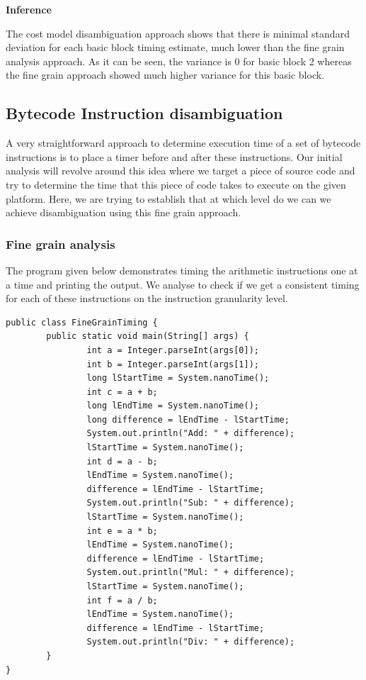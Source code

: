 \documentclass[11pt]{article}
\begin{document}
\textbf{Inference}

The cost model disambiguation approach shows that there is minimal standard deviation for each basic block timing estimate, much lower than the fine grain analysis approach. As it can be seen, the variance is 0 for basic block 2 whereas the fine grain approach showed much higher variance for this basic block.
\newpage

\subsection{Bytecode Instruction disambiguation}
A very straightforward approach to determine execution time of a set of bytecode instructions is to place a timer before and after these instructions. Our initial analysis will revolve around this idea where we target a piece of source code and try to determine the time that this piece of code takes to execute on the given platform. Here, we are trying to establish that at which level do we can we achieve disambiguation using this fine grain approach. 

\subsubsection{Fine grain analysis}

The program given below demonstrates timing the arithmetic instructions one at a time and printing the output. We analyse to check if we get a consistent timing for each of these instructions on the instruction granularity level.

\begin{lstlisting}
public class FineGrainTiming {
        public static void main(String[] args) {
                int a = Integer.parseInt(args[0]);
                int b = Integer.parseInt(args[1]);
                long lStartTime = System.nanoTime();
                int c = a + b;
                long lEndTime = System.nanoTime();
                long difference = lEndTime - lStartTime;
                System.out.println("Add: " + difference);
                lStartTime = System.nanoTime();
                int d = a - b;
                lEndTime = System.nanoTime();
                difference = lEndTime - lStartTime;
                System.out.println("Sub: " + difference);
                lStartTime = System.nanoTime();
                int e = a * b;
                lEndTime = System.nanoTime();
                difference = lEndTime - lStartTime;
                System.out.println("Mul: " + difference);
                lStartTime = System.nanoTime();
                int f = a / b;
                lEndTime = System.nanoTime();
                difference = lEndTime - lStartTime;
                System.out.println("Div: " + difference);
        }
}
\end{lstlisting}
\end{document}
